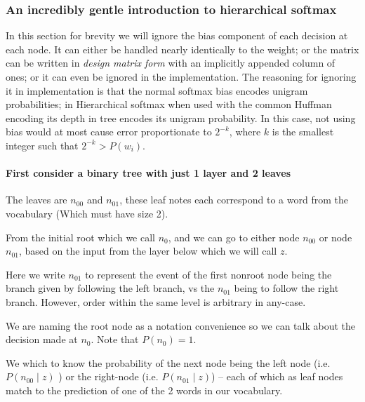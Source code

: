 \documentclass[parskip]{komatufte}
\begin{document}
\subsubsection{An incredibly gentle introduction to hierarchical softmax}

In this section for brevity we will ignore the bias component of each decision at each node.
It can either be handled nearly identically to the weight;
or the matrix can be written in \emph{design matrix form} with an implicitly appended column of ones;
or it can even be ignored in the implementation.
The reasoning for ignoring it in implementation is that the normal softmax bias encodes unigram probabilities;
in Hierarchical softmax when used with the common Huffman encoding its depth in tree encodes its unigram probability. In this case, not using bias would at most cause error proportionate to $2^{-k}$, where $k$ is the smallest integer such that $2^{-k}>P(w_i)$.


\paragraph{First consider a binary tree with just 1 layer and 2 leaves}
The leaves are $n_{00}$ and $n_{01}$, these leaf notes each correspond to a word from the vocabulary (Which must have size 2).

	
From the initial root which we call $n_{0}$, and we can go to
either node $n_{00}$ or node $n_{01}$, based on the input from the
layer below which we will call $z$.

Here we write $n_{01}$ to represent the event of the first nonroot
node being the branch given by following the left branch, vs the $n_{01}$
being to follow the right branch.
However, order within the same level is arbitrary in any-case. 

We are naming the root node as a notation convenience so we can talk
about the decision made at $n_{0}$. 
Note that $P(n_{0})=1$.

We which to know the probability of the next node being the left node (i.e.
$P(n_{00}\mid z)$ ) or the right-node (i.e. $P(n_{01}\mid z)$) -- each of which as leaf nodes match to the prediction of one of the 2 words in our vocabulary.
\end{document}
